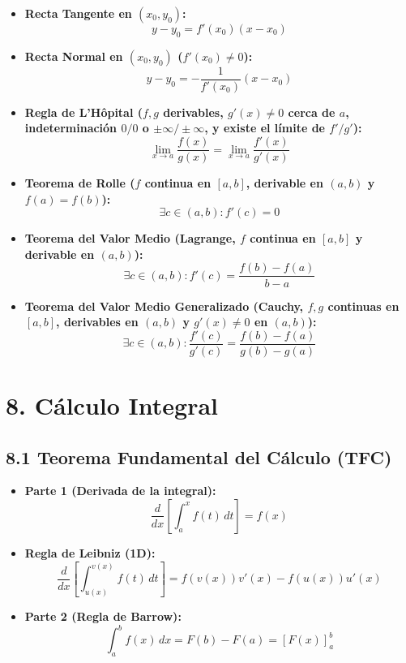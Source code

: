 \documentclass[11pt,a4paper]{article}
\begin{document}
\begin{itemize}
  \item \textbf{Recta Tangente en $(x_0, y_0)$:}
  \[
    y - y_0 = f'(x_0)(x - x_0)
  \]
  \item \textbf{Recta Normal en $(x_0, y_0)$ ($f'(x_0) \ne 0$):}
  \[
    y - y_0 = -\frac{1}{f'(x_0)}(x - x_0)
  \]
  \item \textbf{Regla de L'Hôpital ($f, g$ derivables, $g'(x) \ne 0$ cerca de $a$, indeterminación $0/0$ o $\pm\infty/\pm\infty$, y existe el límite de $f'/g'$):}
  \[
    \lim_{x \to a} \frac{f(x)}{g(x)} = \lim_{x \to a} \frac{f'(x)}{g'(x)}
  \]
  \item \textbf{Teorema de Rolle ($f$ continua en $[a, b]$, derivable en $(a, b)$ y $f(a) = f(b)$):}
  \[
    \exists c \in (a, b) : f'(c) = 0
  \]
  \item \textbf{Teorema del Valor Medio (Lagrange, $f$ continua en $[a, b]$ y derivable en $(a, b)$):}
  \[
    \exists c \in (a, b) : f'(c) = \frac{f(b) - f(a)}{b - a}
  \]
  \item \textbf{Teorema del Valor Medio Generalizado (Cauchy, $f, g$ continuas en $[a, b]$, derivables en $(a, b)$ y $g'(x) \ne 0$ en $(a, b)$):}
  \[
    \exists c \in (a, b) : \frac{f'(c)}{g'(c)} = \frac{f(b) - f(a)}{g(b) - g(a)}
  \]
\end{itemize}

\section*{8. Cálculo Integral}

\subsection*{8.1 Teorema Fundamental del Cálculo (TFC)}

\begin{itemize}
  \item \textbf{Parte 1 (Derivada de la integral):}
  \[
    \frac{d}{dx} \left[ \int_a^x f(t) \, dt \right] = f(x)
  \]
  \item \textbf{Regla de Leibniz (1D):}
  \[
    \frac{d}{dx} \left[ \int_{u(x)}^{v(x)} f(t) \, dt \right] = f(v(x))v'(x) - f(u(x))u'(x)
  \]
  \item \textbf{Parte 2 (Regla de Barrow):}
  \[
    \int_a^b f(x) \, dx = F(b) - F(a) = [F(x)]_a^b
  \]
\end{itemize}
\end{document}
